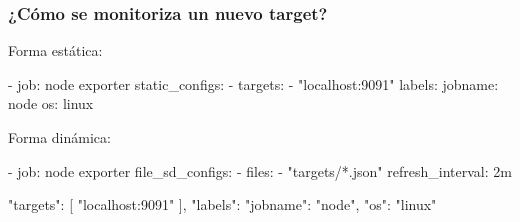 \begin{frame}[label=howto,fragile]
    \frametitle{¿Cómo se monitoriza un nuevo target?}
    \begin{multicols}{2}
        Forma estática:
        \begin{verbbox}[\small\slshape]
- job: node exporter
  static_configs:
  - targets:
    - "localhost:9091"
      labels:
      jobname: node
      os: linux
        \end{verbbox}
        \noindent\hspace{1cm}\fbox{\theverbbox}
        \columnbreak
        
        Forma dinámica:
        \begin{verbbox}[\small\slshape]
- job: node exporter
  file_sd_configs:
  - files:
    - "targets/*.json"
    refresh_interval: 2m
        \end{verbbox}
        \noindent\hspace{1cm}\fbox{\theverbbox}
        \begin{verbbox}[\small\slshape]
{
  "targets": [
    "localhost:9091"
  ],
  "labels": {
    "jobname": "node",
    "os": "linux"
  }
}
        \end{verbbox}
        \noindent\hspace{1in}\fbox{\theverbbox}
    \end{multicols}
  
\end{frame}